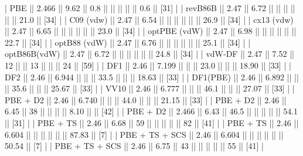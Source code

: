 \documentclass{article}
\begin{document}
| PBE                  || 2.466  || 9.62   || 0.8        ||       ||           ||             ||            || 0.6         || [31]        |
| revB86B              || 2.47   || 6.72   ||            ||       ||           ||             ||            || 21.0        || [34]        |
| C09 (vdw)            || 2.47   || 6.54   ||            ||       ||           ||             ||            || 26.9        || [34]        |
| cx13 (vdw)           || 2.47   || 6.65   ||            ||       ||           ||             ||            || 23.0        || [34]        |
| optPBE (vdW)         || 2.47   || 6.98   ||            ||       ||           ||             ||            || 22.7        || [34]        |
| optB88 (vdW)         || 2.47   || 6.76   ||            ||       ||           ||             ||            || 25.1        || [34]        |
| optB86B(vdW)         || 2.47   || 6.72   ||            ||       ||           ||             ||            || 24.8        || [34]        |
| vdW-DF               || 2.47   || 7.52   || 12         ||       || 13        ||             ||            || 24          || [59]        |
| DF1                  || 2.46   || 7.199  ||            ||       || 23.0      ||             ||            || 18.90       || [33]        |
| DF2                  || 2.46   || 6.944  ||            ||       || 33.5      ||             ||            || 18.63       || [33]        |
| DF1(PBE)             || 2.46   || 6.892  ||            ||       || 35.6      ||             ||            || 25.67       || [33]        |
| VV10                 || 2.46   || 6.777  ||            ||       || 46.1      ||             ||            || 27.07       || [33]        |
| PBE + D2             || 2.46   || 6.740  ||            ||       || 44.0      ||             ||            || 21.15       || [33]        |
| PBE + D2             || 2.46   || 6.45   || 38         ||       ||           ||             || 8.10       ||             || [42]        |
| PBE + D2             || 2.466  || 6.43   || 46.5       ||       ||           ||             ||            || 54.1        || [31]        |
| PBE + TS             || 2.46   || 6.68   || 59         ||       ||           ||             ||            || 82          || [41]        |
| PBE + TS             || 2.46   || 6.604  ||            ||       ||           ||             ||            || 87.83       || [7]         |
| PBE + TS + SCS       || 2.46   || 6.604  ||            ||       ||           ||             ||            || 50.54       || [7]         |
| PBE + TS + SCS       || 2.46   || 6.75   || 43         ||       ||           ||             ||            || 55          || [41]        |
\end{document}

